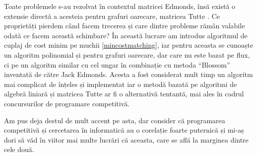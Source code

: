 Toate problemele s-au rezolvat în contextul matricei Edmonds, însă există o extensie
directă a acesteia pentru grafuri oarecare, matricea Tutte \cite{tutte}. Ce
proprietăți pierdem când facem trecerea și care dintre probleme rămân valabile
odată ce facem această schimbare? În această lucrare am introdus algoritmul de
cuplaj de cost minim pe muchii \ref{mincostmatching}, iar pentru aceasta se cunoaște
un algoritm polinomial și pentru grafuri oarecare, dar care nu este bazat pe flux,
ci pe un algoritm similar cu cel ungar în combinație cu metoda ``Blossom'' inventată
de către Jack Edmonds. Acesta a fost considerat mult timp un algoritm mai complicat
de înțeles și implementat iar o metodă bazată pe algoritmi de algebră liniară și
matricea Tutte ar fi o alternativă tentantă, mai ales în cadrul concursurilor de
programare competitivă.

Am pus deja destul de mult accent pe asta, dar consider că programarea competitivă
și cercetarea în informatică au o corelație foarte puternică și mi-aș dori să văd
în viitor mai multe lucrări că aceasta, care se află la marginea dintre cele două.

